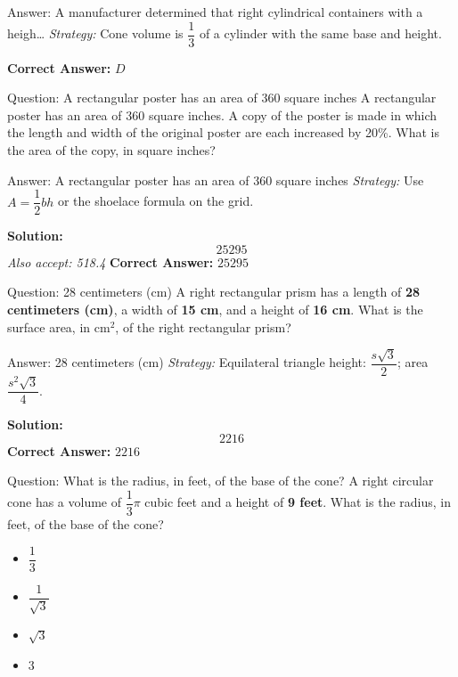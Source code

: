 \documentclass{beamer}
\begin{document}
\begin{frame}{Answer: A manufacturer determined that right cylindrical containers with a heigh…}
\textit{Strategy:} Cone volume is $\dfrac{1}{3}$ of a cylinder with the same base and height.

\textbf{Correct Answer:} \( \boxed{D} \)

\end{frame}
\begin{frame}{Question: A rectangular poster has an area of 360 square inches}
A rectangular poster has an area of 360 square inches.  
A copy of the poster is made in which the length and width of the original poster are each increased by 20\%.  
What is the area of the copy, in square inches?
\end{frame}
\begin{frame}{Answer: A rectangular poster has an area of 360 square inches}
\textit{Strategy:} Use $A=\dfrac{1}{2}bh$ or the shoelace formula on the grid.

\textbf{Solution:}
\[ \boxed{25295} \]
\textit{Also accept: 518.4}
\textbf{Correct Answer:} \( \boxed{25295} \)

\end{frame}
\begin{frame}{Question: 28 centimeters (cm)}
A right rectangular prism has a length of \textbf{28 centimeters (cm)},  
a width of \textbf{15 cm}, and a height of \textbf{16 cm}.  
What is the surface area, in cm$^2$, of the right rectangular prism?
\end{frame}
\begin{frame}{Answer: 28 centimeters (cm)}
\textit{Strategy:} Equilateral triangle height: $\dfrac{s\sqrt{3}}{2}$; area $\dfrac{s^2\sqrt{3}}{4}$.

\textbf{Solution:}
\[ \boxed{2216} \]
\textbf{Correct Answer:} \( \boxed{2216} \)

\end{frame}
\begin{frame}{Question: What is the radius, in feet, of the base of the cone?}
A right circular cone has a volume of $\dfrac{1}{3}\pi$ cubic feet and a height of \textbf{9 feet}.  
What is the radius, in feet, of the base of the cone?
\begin{itemize}
    \item[\textbf{A.}] $\dfrac{1}{3}$
    \item[\textbf{B.}] $\dfrac{1}{\sqrt{3}}$
    \item[\textbf{C.}] $\sqrt{3}$
    \item[\textbf{D.}] 3
\end{itemize}
\end{frame}
\end{document}
